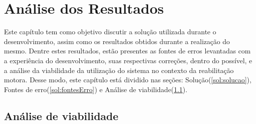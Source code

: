\chapter[Análise dos Resultados]{Análise dos Resultados}\label{ch:analiseResultados}
  Este capítulo tem como objetivo discutir a solução utilizada durante o
desenvolvimento, assim como os resultados obtidos durante a realização do mesmo. Dentre estes
resultados, estão presentes as fontes de erros levantadas com a experiência do desenvolvimento,
suas respectivas correções, dentro do possível, e a análise da viabilidade da utilização do
sistema no contexto da reabilitação motora. Desse modo, este
capítulo está dividido nas seções: Solução(\ref{sol:solucao}), Fontes de erro(\ref{sol:fontesErro}) e Análise de viabilidade(\ref{sol:viabilidade}).

\section{Análise de viabilidade}\label{sol:viabilidade}
